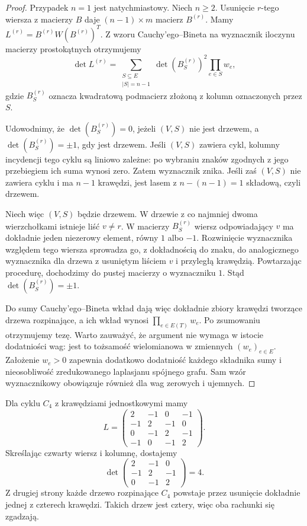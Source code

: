 \begin{proof}
Przypadek $n=1$ jest natychmiastowy. Niech $n\ge2$.
Usunięcie $r$-tego wiersza z macierzy $B$ daje
$(n-1)\times m$ macierz $B^{(r)}$. Mamy
$L^{(r)}=B^{(r)}W(B^{(r)})^T$.
Z wzoru Cauchy'ego--Bineta na wyznacznik iloczynu
macierzy prostokątnych otrzymujemy
\[
\det L^{(r)}=\sum_{\substack{S\subseteq E\\|S|=n-1}}
  \det(B^{(r)}_S)^2\prod_{e\in S}w_e,
\]
gdzie $B^{(r)}_S$ oznacza kwadratową podmacierz
złożoną z kolumn oznaczonych przez $S$.

Udowodnimy, że $\det(B^{(r)}_S)=0$, jeżeli $(V,S)$
nie jest drzewem, a $\det(B^{(r)}_S)=\pm1$, gdy jest
drzewem. Jeśli $(V,S)$ zawiera cykl, kolumny
incydencji tego cyklu są liniowo zależne: po wybraniu
znaków zgodnych z jego przebiegiem ich suma wynosi zero.
Zatem wyznacznik znika. Jeśli zaś $(V,S)$ nie zawiera
cyklu i ma $n-1$ krawędzi, jest lasem z
$n-(n-1)=1$ składową, czyli drzewem.

Niech więc $(V,S)$ będzie drzewem. W drzewie z co najmniej
dwoma wierzchołkami istnieje liść $v\ne r$.
W macierzy $B^{(r)}_S$ wiersz odpowiadający $v$
ma dokładnie jeden niezerowy element, równy $1$ albo $-1$.
Rozwinięcie wyznacznika względem tego wiersza sprowadza
go, z dokładnością do znaku, do analogicznego wyznacznika
dla drzewa z usuniętym liściem $v$ i przyległą krawędzią.
Powtarzając procedurę, dochodzimy do pustej macierzy
o wyznaczniku $1$. Stąd $\det(B^{(r)}_S)=\pm1$.

Do sumy Cauchy'ego--Bineta wkład dają więc dokładnie
zbiory krawędzi tworzące drzewa rozpinające, a ich
wkład wynosi $\prod_{e\in E(T)}w_e$.
Po zsumowaniu otrzymujemy tezę.
Warto zauważyć, że argument nie wymaga w istocie dodatniości
wag: jest to tożsamość wielomianowa w zmiennych $(w_e)_{e\in E}$.
Założenie $w_e>0$ zapewnia dodatkowo dodatniość każdego
składnika sumy i nieosobliwość zredukowanego laplasjanu
spójnego grafu. Sam wzór wyznacznikowy obowiązuje również
dla wag zerowych i ujemnych.
\end{proof}

\begin{przyklad}
Dla cyklu $C_4$ z krawędziami jednostkowymi mamy
\[
L=\begin{pmatrix}
2&-1&0&-1\\-1&2&-1&0\\0&-1&2&-1\\-1&0&-1&2
\end{pmatrix}.
\]
Skreślając czwarty wiersz i kolumnę, dostajemy
\[
\det\begin{pmatrix}2&-1&0\\-1&2&-1\\0&-1&2\end{pmatrix}=4.
\]
Z drugiej strony każde drzewo rozpinające $C_4$
powstaje przez usunięcie dokładnie jednej z czterech
krawędzi. Takich drzew jest cztery, więc oba rachunki
się zgadzają.
\end{przyklad}

